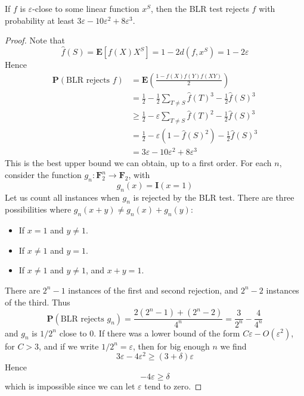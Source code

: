 \begin{theorem}
    If $f$ is $\varepsilon$-close to some linear function $x^S$, then the BLR test rejects $f$ with probability at least $3\varepsilon - 10 \varepsilon^2 + 8 \varepsilon^3$.
\end{theorem}
\begin{proof}
    Note that
    \[ \widehat{f}(S) = \mathbf{E}[f(X)X^S] = 1 - 2d(f,x^S) = 1 - 2\varepsilon \]
    Hence
    \begin{align*}
        \mathbf{P}(\text{BLR rejects $f$}) &= \mathbf{E} \left( \frac{1 - f(X)f(Y)f(XY)}{2} \right)\\
        &= \frac{1}{2} - \frac{1}{2} \sum_{T \neq S} \widehat{f}(T)^3  - \frac{1}{2} \widehat{f}(S)^3\\
        &\geq \frac{1}{2}  - \varepsilon \sum_{T \neq S} \widehat{f}(T)^2 - \frac{1}{2} \widehat{f}(S)^3\\
        &= \frac{1}{2} - \varepsilon (1 - \widehat{f}(S)^2) - \frac{1}{2} \widehat{f}(S)^3\\
        &=  3\varepsilon - 10 \varepsilon^2 + 8 \varepsilon^3
    \end{align*}
    This is the best upper bound we can obtain, up to a first order. For each $n$, consider the function $g_n: \mathbf{F}_2^n \to \mathbf{F}_2$, with
    \[ g_n(x) = \mathbf{I}(x = 1) \]
    Let us count all instances when $g_n$ is rejected by the BLR test. There are three possibilities where $g_n(x + y) \neq g_n(x) + g_n(y)$:
    \begin{itemize}
        \item If $x = 1$ and $y \neq 1$.
        \item If $x \neq 1$ and $y = 1$.
        \item If $x \neq 1$ and $y \neq 1$, and $x + y = 1$.
    \end{itemize}
    There are $2^n - 1$ instances of the first and second rejection, and $2^n - 2$ instances of the third. Thus
    \[ \mathbf{P}(\text{BLR rejects $g_n$}) = \frac{2(2^n - 1) + (2^n - 2)}{4^n} = \frac{3}{2^n} - \frac{4}{4^n} \]
    and $g_n$ is $1/2^n$ close to $0$. If there was a lower bound of the form $C \varepsilon - O(\varepsilon^2)$, for $C > 3$, and if we write $1/2^n = \varepsilon$, then for big enough $n$ we find
    \[ 3\varepsilon - 4\varepsilon^2 \geq (3 + \delta) \varepsilon \]
    Hence
    \[ -4\varepsilon \geq \delta \]
    which is impossible since we can let $\varepsilon$ tend to zero.
\end{proof}

